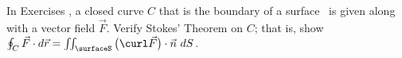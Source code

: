 {\noindent In Exercises}
{, a closed curve $C$ that is the boundary of a surface \surfaceS\ is given along with a vector field $\vec F$. Verify Stokes' Theorem on $C$; that is, show $\oint_C \vec F\cdot d\vec r = \iint_\surfaceS\big(\curl \vec F\big)\cdot\vec n\ dS$.
}
